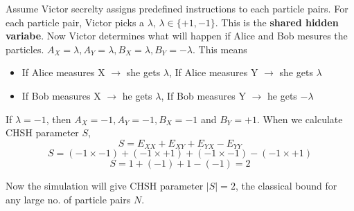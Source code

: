 \documentclass[17pt,a4paper]{extarticle}
\begin{document}
Assume Victor secrelty assigns predefined instructions to each particle pairs. For each particle pair, Victor picks a $\lambda$, $\lambda \in \{+1, -1\}$. This is the \textbf{shared hidden variabe}. Now Victor determines what will happen if Alice and Bob mesures the particles. $A_X=\lambda, A_Y=\lambda, B_X=\lambda, B_Y=-\lambda$. This means

\begin{itemize}
\item If Alice measures X $\rightarrow$ she gets $\lambda$, If Alice measures Y $\rightarrow$ she gets $\lambda$
\item If Bob measures X $\rightarrow$ he gets $\lambda$, If Bob measures Y $\rightarrow$ he gets $-\lambda$
\end{itemize}

If $\lambda = -1$, then $A_X=-1, A_Y=-1, B_X=-1$ and $B_Y=+1$.
When we calculate CHSH parameter $S$,
\setcounter{equation}{0}
\begin{equation}
S=E_{XX}+E_{XY}+E_{YX}-E_{YY}
\end{equation}
\begin{equation}
S=(-1 \times -1)+(-1 \times +1)+(-1 \times -1)-(-1 \times +1)
\end{equation}
\begin{equation}
S=1+(-1)+1-(-1)=2
\end{equation}

Now the simulation will give CHSH parameter $|S|=2$, the classical bound for any large no. of particle pairs $N$.
\end{document}
